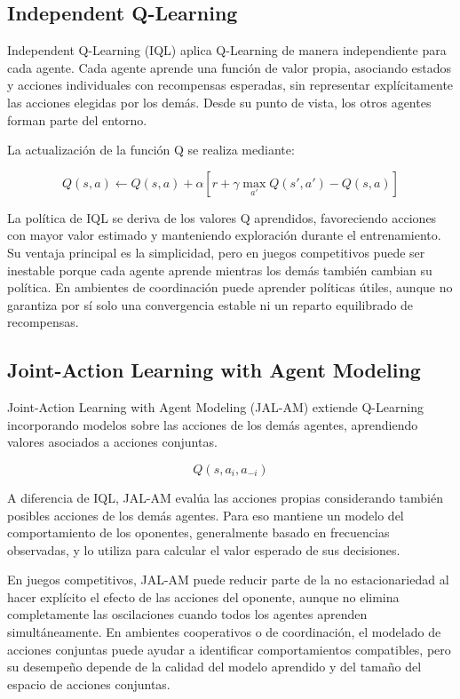 \documentclass[letterpaper,12pt]{article} %
\begin{document}
\subsection{Independent Q-Learning}

Independent Q-Learning (IQL) aplica Q-Learning de manera independiente para cada agente. Cada agente aprende una función de valor propia, asociando estados y acciones individuales con recompensas esperadas, sin representar explícitamente las acciones elegidas por los demás. Desde su punto de vista, los otros agentes forman parte del entorno.

La actualización de la función Q se realiza mediante:

\[
Q(s,a) \leftarrow Q(s,a) +
\alpha
\left[
r + \gamma \max_{a'} Q(s',a') - Q(s,a)
\right]
\]

La política de IQL se deriva de los valores Q aprendidos, favoreciendo acciones con mayor valor estimado y manteniendo exploración durante el entrenamiento. Su ventaja principal es la simplicidad, pero en juegos competitivos puede ser inestable porque cada agente aprende mientras los demás también cambian su política. En ambientes de coordinación puede aprender políticas útiles, aunque no garantiza por sí solo una convergencia estable ni un reparto equilibrado de recompensas.

\subsection{Joint-Action Learning with Agent Modeling}

Joint-Action Learning with Agent Modeling (JAL-AM) extiende Q-Learning incorporando modelos sobre las acciones de los demás agentes, aprendiendo valores asociados a acciones conjuntas.

\[
Q(s,a_i,a_{-i})
\]

A diferencia de IQL, JAL-AM evalúa las acciones propias considerando también posibles acciones de los demás agentes. Para eso mantiene un modelo del comportamiento de los oponentes, generalmente basado en frecuencias observadas, y lo utiliza para calcular el valor esperado de sus decisiones.

En juegos competitivos, JAL-AM puede reducir parte de la no estacionariedad al hacer explícito el efecto de las acciones del oponente, aunque no elimina completamente las oscilaciones cuando todos los agentes aprenden simultáneamente. En ambientes cooperativos o de coordinación, el modelado de acciones conjuntas puede ayudar a identificar comportamientos compatibles, pero su desempeño depende de la calidad del modelo aprendido y del tamaño del espacio de acciones conjuntas.
\end{document}
